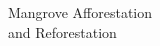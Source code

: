 \documentclass[preview]{standalone}
\begin{document}
\begin{center}
Mangrove Afforestation\\and Reforestation
\end{center}
\end{document}
